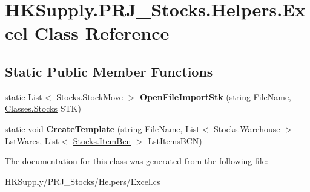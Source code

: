 \hypertarget{class_h_k_supply_1_1_p_r_j___stocks_1_1_helpers_1_1_excel}{}\section{H\+K\+Supply.\+P\+R\+J\+\_\+\+Stocks.\+Helpers.\+Excel Class Reference}
\label{class_h_k_supply_1_1_p_r_j___stocks_1_1_helpers_1_1_excel}
\subsection*{Static Public Member Functions}
\begin{DoxyCompactItemize}
\item 
\mbox{\label{class_h_k_supply_1_1_p_r_j___stocks_1_1_helpers_1_1_excel_a85d584f94097099ea467a04cfccdc399}} 
static List$<$ \mbox{\hyperlink{class_h_k_supply_1_1_p_r_j___stocks_1_1_classes_1_1_stocks_1_1_stock_move}{Stocks.\+Stock\+Move}} $>$ {\bfseries Open\+File\+Import\+Stk} (string File\+Name, \mbox{\hyperlink{class_h_k_supply_1_1_p_r_j___stocks_1_1_classes_1_1_stocks}{Classes.\+Stocks}} S\+TK)
\item 
\mbox{\label{class_h_k_supply_1_1_p_r_j___stocks_1_1_helpers_1_1_excel_a40f6912be018cdc8d437fe1650b7299d}} 
static void {\bfseries Create\+Template} (string File\+Name, List$<$ \mbox{\hyperlink{class_h_k_supply_1_1_p_r_j___stocks_1_1_classes_1_1_stocks_1_1_warehouse}{Stocks.\+Warehouse}} $>$ Lst\+Wares, List$<$ \mbox{\hyperlink{class_h_k_supply_1_1_p_r_j___stocks_1_1_classes_1_1_stocks_1_1_item_bcn}{Stocks.\+Item\+Bcn}} $>$ Lst\+Items\+B\+CN)
\end{DoxyCompactItemize}


The documentation for this class was generated from the following file\+:\begin{DoxyCompactItemize}
\item 
H\+K\+Supply/\+P\+R\+J\+\_\+\+Stocks/\+Helpers/Excel.\+cs\end{DoxyCompactItemize}
